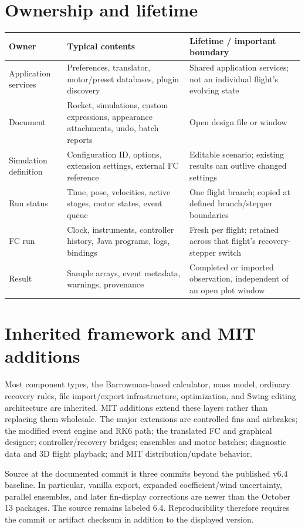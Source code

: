 \section{Ownership and lifetime}
\begin{tabularx}{\linewidth}{@{}L{3cm}YY@{}}\toprule
Owner & Typical contents & Lifetime / important boundary\\\midrule
Application services & Preferences, translator, motor/preset databases, plugin discovery & Shared application services; not an individual flight's evolving state\\
Document & Rocket, simulations, custom expressions, appearance attachments, undo, batch reports & Open design file or window\\
Simulation definition & Configuration ID, options, extension settings, external FC reference & Editable scenario; existing results can outlive changed settings\\
Run status & Time, pose, velocities, active stages, motor states, event queue & One flight branch; copied at defined branch/stepper boundaries\\
FC run & Clock, instruments, controller history, Java programs, logs, bindings & Fresh per flight; retained across that flight's recovery-stepper switch\\
Result & Sample arrays, event metadata, warnings, provenance & Completed or imported observation, independent of an open plot window\\\bottomrule
\end{tabularx}

\section{Inherited framework and MIT additions}
Most component types, the Barrowman-based calculator, mass model, ordinary recovery rules, file import/export infrastructure, optimization, and Swing editing architecture are inherited. MIT additions extend these layers rather than replacing them wholesale. The major extensions are controlled fins and airbrakes; the modified event engine and RK6 path; the translated FC and graphical designer; controller/recovery bridges; ensembles and motor batches; diagnostic data and 3D flight playback; and MIT distribution/update behavior.

Source at the documented commit is three commits beyond the published v6.4 baseline. In particular, vanilla export, expanded coefficient/wind uncertainty, parallel ensembles, and later fin-display corrections are newer than the October 13 packages. The source remains labeled 6.4. Reproducibility therefore requires the commit or artifact checksum in addition to the displayed version.

